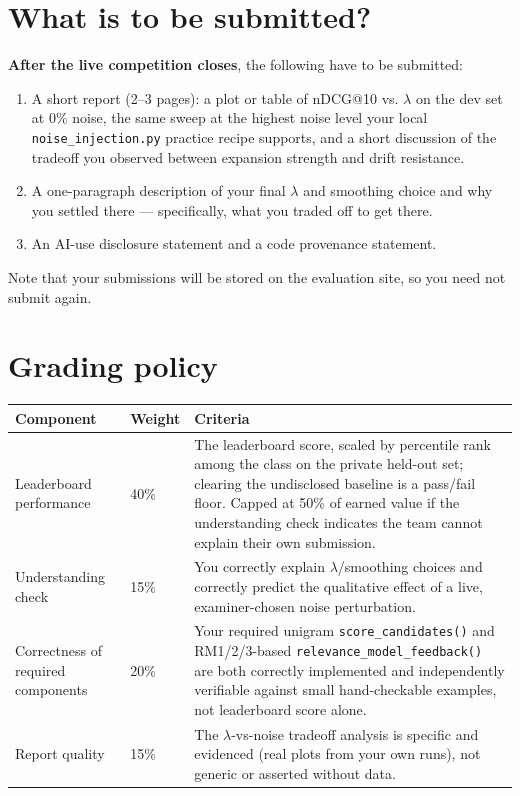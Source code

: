 \documentclass[10pt]{article}
\begin{document}
\section{What is to be submitted?}

\textbf{After the live competition closes}, the following have to be submitted:
\begin{enumerate}
\item A short report (2–3 pages): a plot or table of nDCG@10 vs. $\lambda$ on the dev set at 0\% noise, the same sweep at the highest noise level your local \texttt{noise\_injection.py} practice recipe supports, and a short discussion of the tradeoff you observed between expansion strength and drift resistance.
\item A one-paragraph description of your final $\lambda$ and smoothing choice and why you settled there — specifically, what you traded off to get there.
\item An AI-use disclosure statement and a code provenance statement.
\end{enumerate}

Note that your submissions will be stored on the evaluation site, so you need not submit again. 

\section{Grading policy}
\begin{center}
\begin{tabular}{|p{3.5cm}|l|p{10cm}|} 
\hline	
\textbf{Component} &	Weight &	Criteria \\
\hline
\hline

Leaderboard performance	& 40\%	& The leaderboard score, scaled by percentile rank among the class on the private held-out set; clearing the undisclosed baseline is a pass/fail floor. Capped at 50\% of earned value if the understanding check indicates the team cannot explain their own submission. \\
\hline
Understanding check	& 15\%	& You correctly explain $\lambda$/smoothing choices and correctly predict the qualitative effect of a live, examiner-chosen noise perturbation. \\ 
\hline
Correctness of required components & 20\%	& Your required unigram \texttt{score\_candidates()} and RM1/2/3-based \texttt{relevance\_model\_feedback()} are both correctly implemented and independently verifiable against small hand-checkable examples, not leaderboard score alone. \\
\hline
Report quality	& 15\%	& The $\lambda$-vs-noise tradeoff analysis is specific and evidenced (real plots from your own runs), not generic or asserted without data.\\
\hline
\end{tabular}
\end{center}
\end{document}
